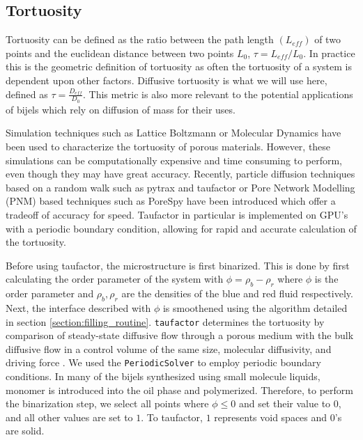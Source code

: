 \subsection{Tortuosity}
\label{section:tortuosity}

Tortuosity can be defined as the ratio between the path length $(L_{eff})$ of two points and the euclidean distance 
between two points $L_{0}$, $\tau = L_{eff}/L_{0}$. In practice this is the geometric definition of tortuosity as 
often the tortuosity of a system is dependent upon other factors. Diffusive tortuosity is what we will use here, 
defined as $\tau = \frac{D_{eff}}{D_0}$. This metric is also more relevant to the potential applications of bijels 
which rely on diffusion of mass for their uses.

Simulation techniques such as Lattice Boltzmann or Molecular Dynamics have been used to characterize the tortuosity of 
porous materials. However, these simulations can be computationally expensive and time consuming to perform, even though 
they may have great accuracy. Recently, particle diffusion techniques based on a random walk such as pytrax and taufactor 
or Pore Network Modelling (PNM) based techniques such as PoreSpy have been introduced which offer a tradeoff of accuracy 
for speed. Taufactor in particular is implemented on GPU's with a periodic boundary condition, allowing for rapid and 
accurate calculation of the tortuosity.


Before using taufactor, the microstructure is first binarized. This is done by first calculating the order parameter of 
the system with $\phi = \rho_b - \rho_r$ where $\phi$ is the order parameter and $\rho_b, \rho_r$ are the densities of 
the blue and red fluid respectively. Next, the interface described with $\phi$ is smoothened using the algorithm detailed 
in section \ref{section:filling_routine}. \texttt{taufactor} determines the tortuosity by comparison
of steady-state diffusive flow through a porous medium with the bulk
diffusive flow in a control volume of the same size, molecular
diffusivity, and driving force \cite{cooper_taufactor_2016, kench_taufactor_2023}. We used
the \texttt{PeriodicSolver} to employ periodic boundary conditions. In many of the bijels synthesized using small molecule liquids, monomer is 
introduced into the oil phase and polymerized. Therefore, to perform the binarization step, we select all points where 
$\phi \leq 0$ and set their value to $0$, and all other values are set to $1$. To taufactor, $1$ represents void spaces 
and 0's are solid. \cite{cooper_taufactor_2016, kench_taufactor_2023}

